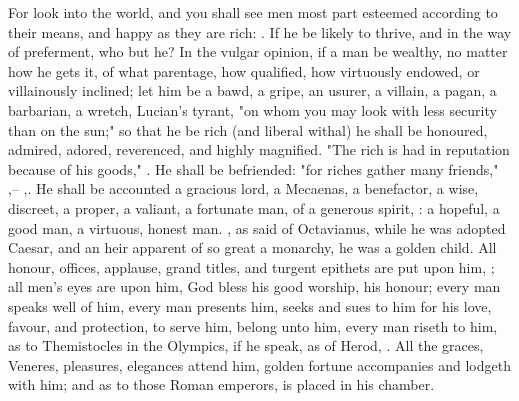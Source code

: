 For look into the world, and you shall see men most part esteemed according to
their means, and happy as they are rich: . If he be likely to thrive, and in the way of
preferment, who but he? In the vulgar opinion, if a man be wealthy, no matter
how he gets it, of what parentage, how qualified, how virtuously endowed, or
villainously inclined; let him be a bawd, a gripe, an usurer, a villain, a
pagan, a barbarian, a wretch, Lucian's tyrant, "on whom
you may look with less security than on the sun;" so that he be rich (and
liberal withal) he shall be honoured, admired, adored, reverenced, and highly
magnified. "The rich is had in reputation because of his
goods," . He shall be befriended: "for riches gather
many friends," ,-- ,. He shall be
accounted a gracious lord, a Mecaenas, a benefactor, a wise, discreet, a
proper, a valiant, a fortunate man, of a generous spirit, : a hopeful, a good man, a virtuous, honest man.
, as
\Tully{} said of Octavianus, while he was adopted Caesar, and
an heir apparent of so great a monarchy, he was a golden
child. All honour, offices, applause, grand titles, and
turgent epithets are put upon him, ; all men's eyes
are upon him, God bless his good worship, his honour;
every man speaks well of him, every man presents him,
seeks and sues to him for his love, favour, and protection, to serve him,
belong unto him, every man riseth to him, as to Themistocles in the Olympics,
if he speak, as of Herod, . All the graces, Veneres, pleasures, elegances attend him,
golden fortune accompanies and lodgeth with him; and as to
those Roman emperors, is placed in his chamber.

